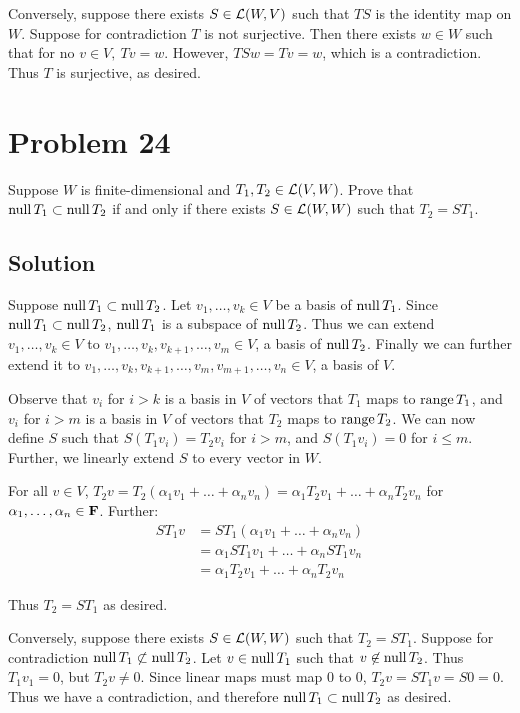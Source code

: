\documentclass{article}
\begin{document}
\vs

Conversely, suppose there exists $S\in\L(W,V)$ such that $TS$ is the identity map on $W$. Suppose for contradiction $T$ is not surjective. Then there exists $w\in W$ such that for no $v\in V,\ Tv=w$. However, $TSw=Tv=w$, which is a contradiction. Thus $T$ is surjective, as desired.

\newpage
\section*{Problem 24}
Suppose $W$ is finite-dimensional and $T_1,T_2\in\L(V,W)$. Prove that $\text{null}\, T_1\subset \text{null}\, T_2$ if and only if there exists $S\in\L(W,W)$ such that $T_2=ST_1$.

\subsection*{Solution}
Suppose $\text{null}\, T_1\subset \text{null}\, T_2$. Let $v_1,\ldots,v_k\in V$ be a basis of $\text{null}\, T_1$. Since $\text{null}\, T_1\subset \text{null}\, T_2$, $\text{null}\, T_1$ is a subspace of $\text{null}\, T_2$. Thus we can extend $v_1,\ldots,v_k\in V$ to $v_1,\ldots,v_k, v_{k+1},\ldots,v_m\in V$, a basis of $\text{null}\, T_2$. Finally we can further extend it to $v_1,\ldots,v_k, v_{k+1},\ldots,v_m,v_{m+1},\ldots,v_n\in V$, a basis of $V$.

\vs

Observe that $v_i$ for $i>k$ is a basis in $V$ of vectors that $T_1$ maps to $\text{range}\, T_1$, and $v_i$ for $i>m$ is a basis in $V$ of vectors that $T_2$ maps to $\text{range}\, T_2$. We can now define $S$ such that $S(T_1v_i)=T_2v_i$ for $i>m$, and $S(T_1v_i)=0$ for $i\leq m$. Further, we linearly extend $S$ to every vector in $W$.

\vs

For all $v\in V$, $T_2v=T_2(\alpha_1v_1+\ldots+\alpha_n v_n)=\alpha_1T_2v_1+\ldots+\alpha_n T_2v_n$ for $\alpha_1,\ldots,\alpha_n\in\mathbf{F}$. Further:
\begin{align*}
    ST_1v&=ST_1(\alpha_1v_1+\ldots+\alpha_n v_n)\\
    &=\alpha_1ST_1v_1+\ldots+\alpha_n ST_1v_n\\
    &=\alpha_1T_2v_1+\ldots+\alpha_n T_2v_n
\end{align*}

Thus $T_2=ST_1$ as desired.

\vs

Conversely, suppose there exists $S\in\L(W,W)$ such that $T_2=ST_1$. Suppose for contradiction $\text{null}\, T_1\not\subset \text{null}\, T_2$. Let $v\in\text{null}\, T_1$ such that $v\not\in\text{null}\, T_2$. Thus $T_1v_1=0$, but $T_2v\neq0$. Since linear maps must map $0$ to $0$, $T_2v=ST_1v=S0=0$. Thus we have a contradiction, and therefore $\text{null}\, T_1\subset \text{null}\, T_2$ as desired.
\end{document}
